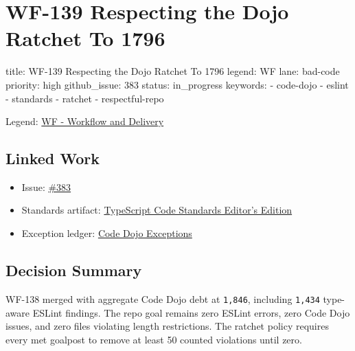 \chapter{WF-139 Respecting the Dojo Ratchet To 1796}\label{record-221}

\smallskip

\begin{RecordMeta}
title: WF-139 Respecting the Dojo Ratchet To 1796
legend: WF
lane: bad-code
priority: high
github_issue: 383
status: in_progress
keywords:
  - code-dojo
  - eslint
  - standards
  - ratchet
  - respectful-repo

\end{RecordMeta}

Legend: \href{https://github.com/flyingrobots/bijou/blob/cbd70612140e7a450d764b3c7be1c6af878b99bc/docs/legends/WF-workflow-delivery.md}{WF - Workflow and Delivery}

\section{Linked Work}\label{record-221-linked-work}

\begin{itemize}
\tightlist
\item
  Issue: \href{https://github.com/flyingrobots/bijou/issues/383}{\#383}
\item
  Standards artifact: \href{https://github.com/flyingrobots/bijou/blob/cbd70612140e7a450d764b3c7be1c6af878b99bc/docs/typescript-code-standards.editors-edition.md}{TypeScript Code Standards Editor's Edition}
\item
  Exception ledger: \href{https://github.com/flyingrobots/bijou/blob/cbd70612140e7a450d764b3c7be1c6af878b99bc/docs/code-dojo-exceptions.md}{Code Dojo Exceptions}
\end{itemize}

\section{Decision Summary}\label{record-221-decision-summary}

WF-138 merged with aggregate Code Dojo debt at \texttt{1\allowbreak{},\allowbreak{}8\allowbreak{}4\allowbreak{}6}, including \texttt{1\allowbreak{},\allowbreak{}4\allowbreak{}3\allowbreak{}4} type-aware ESLint findings. The repo goal remains zero ESLint errors, zero Code Dojo issues, and zero files violating length restrictions. The ratchet policy requires every met goalpost to remove at least 50 counted violations until zero.


